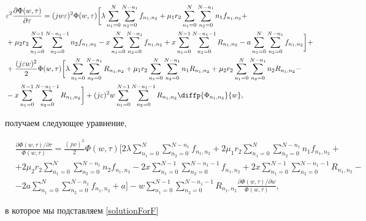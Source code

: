 \begin{equation*}
	\begin{split}
		&\varepsilon^2 \frac{\partial \Phi (w,\tau)}{\partial \tau}=(jw\varepsilon)^2\Phi (w,\tau)\bigg[\lambda\sum_{n_1=0}^N\sum_{n_2=0}^{N-n_1}f_{n_{1}, n_{2}}+\mu_{1}r_{2}\sum_{n_1=0}^{N}\sum_{n_2=0}^{N-n_1}n_{1}f_{n_{1}, n_{2}}+\\
		&+\mu_{2} r_{2}\sum_{n_1=0}^{N-1}\sum_{n_2=0}^{N-n_1-1}n_{2}f_{n_{1}, n_{2}}-x\sum_{n_1=0}^{N}\sum_{n_2=0}^{N-n_1}f_{n_{1}, n_{2}}+x\sum_{n_1=0}^{N-1}\sum_{n_2=0}^{N-n_1-1}R_{n_{1}, n_{2}}-a\sum_{n_1=0}^N\sum_{n_2=0}^{N-n_1}f_{n_{1}, n_{2}}\bigg]+\\
		& +\frac{(j\varepsilon w)^2}{2}\Phi (w,\tau)\bigg[\lambda\sum_{n_1=0}^N\sum_{n_2=0}^{N-n_1}R_{n_{1}, n_{2}}+\mu_{1}r_{2}\sum_{n_1=0}^{N}\sum_{n_2=0}^{N-n_1}n_{1}R_{n_{1}, n_{2}}+\mu_{2} r_{2}\sum_{n_1=0}^{N}\sum_{n_2=0}^{N-n_1}n_{2}R_{n_{1}, n_{2}}-\\
		&-x\sum_{n_1=0}^{N-1}\sum_{n_2=0}^{N-n_1-1}R_{n_{1}, n_{2}}\bigg]+(j\varepsilon)^2 w\sum_{n_1=0}^{N-1}\sum_{n_2=0}^{N-n_1-1}R_{n_{1}, n_{2}}\diffp{\Phi_{n_{1}, n_{2}}}{w},
	\end{split}
\end{equation*}

получаем следующее уравнение,

\begin{equation*}
	\begin{split}
		& \frac{\partial \Phi (w,\tau) /\partial\tau}{ \Phi (w,\tau)}=
		\frac{(j w)^2}{2}\Phi (w,\tau)\bigg[2\lambda\sum_{n_1=0}^N\sum_{n_2=0}^{N-n_1}f_{n_{1}, n_{2}}+2\mu_{1} r_{2}\sum_{n_1=0}^{N}\sum_{n_2=0}^{N-n_1}n_{1}f_{n_{1}, n_{2}}+\\
		&+2\mu_{2}r_{2}\sum_{n_1=0}^{N}\sum_{n_2=0}^{N-n_1}n_{2}f_{n_{1}, n_{2}}-2x\sum_{n_1=0}^{N-1}\sum_{n_2=0}^{N-n_1-1}f_{n_{1}, n_{2}}+2x\sum_{n_1=0}^{N-1}\sum_{n_2=0}^{N-n_1-1}R_{n_{1}, n_{2}}-\\
		&-2a\sum_{n_1=0}^N\sum_{n_2=0}^{N-n_1}f_{n_{1}, n_{2}}+a\bigg]-w\sum_{n_1=0}^{N-1}\sum_{n_2=0}^{N-n_1-1}R_{n_{1}, n_{2}} \frac{\partial \Phi (w,\tau)/\partial w}{ \Phi (w,\tau)},
	\end{split}
\end{equation*}

в которое мы подставляем \eqref{solutionForF}

